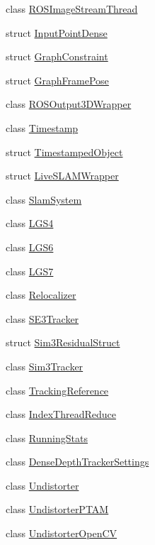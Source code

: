 \begin{DoxyCompactItemize}
class \hyperlink{classlsd__slam_1_1_r_o_s_image_stream_thread}{R\-O\-S\-Image\-Stream\-Thread}
\item 
struct \hyperlink{structlsd__slam_1_1_input_point_dense}{Input\-Point\-Dense}
\item 
struct \hyperlink{structlsd__slam_1_1_graph_constraint}{Graph\-Constraint}
\item 
struct \hyperlink{structlsd__slam_1_1_graph_frame_pose}{Graph\-Frame\-Pose}
\item 
class \hyperlink{classlsd__slam_1_1_r_o_s_output3_d_wrapper}{R\-O\-S\-Output3\-D\-Wrapper}
\item 
class \hyperlink{classlsd__slam_1_1_timestamp}{Timestamp}
\item 
struct \hyperlink{structlsd__slam_1_1_timestamped_object}{Timestamped\-Object}
\item 
struct \hyperlink{structlsd__slam_1_1_live_s_l_a_m_wrapper}{Live\-S\-L\-A\-M\-Wrapper}
\item 
class \hyperlink{classlsd__slam_1_1_slam_system}{Slam\-System}
\item 
class \hyperlink{classlsd__slam_1_1_l_g_s4}{L\-G\-S4}
\item 
class \hyperlink{classlsd__slam_1_1_l_g_s6}{L\-G\-S6}
\item 
class \hyperlink{classlsd__slam_1_1_l_g_s7}{L\-G\-S7}
\item 
class \hyperlink{classlsd__slam_1_1_relocalizer}{Relocalizer}
\item 
class \hyperlink{classlsd__slam_1_1_s_e3_tracker}{S\-E3\-Tracker}
\item 
struct \hyperlink{structlsd__slam_1_1_sim3_residual_struct}{Sim3\-Residual\-Struct}
\item 
class \hyperlink{classlsd__slam_1_1_sim3_tracker}{Sim3\-Tracker}
\item 
class \hyperlink{classlsd__slam_1_1_tracking_reference}{Tracking\-Reference}
\item 
class \hyperlink{classlsd__slam_1_1_index_thread_reduce}{Index\-Thread\-Reduce}
\item 
class \hyperlink{classlsd__slam_1_1_running_stats}{Running\-Stats}
\item 
class \hyperlink{classlsd__slam_1_1_dense_depth_tracker_settings}{Dense\-Depth\-Tracker\-Settings}
\item 
class \hyperlink{classlsd__slam_1_1_undistorter}{Undistorter}
\item 
class \hyperlink{classlsd__slam_1_1_undistorter_p_t_a_m}{Undistorter\-P\-T\-A\-M}
\item 
class \hyperlink{classlsd__slam_1_1_undistorter_open_c_v}{Undistorter\-Open\-C\-V}
\end{DoxyCompactItemize}
